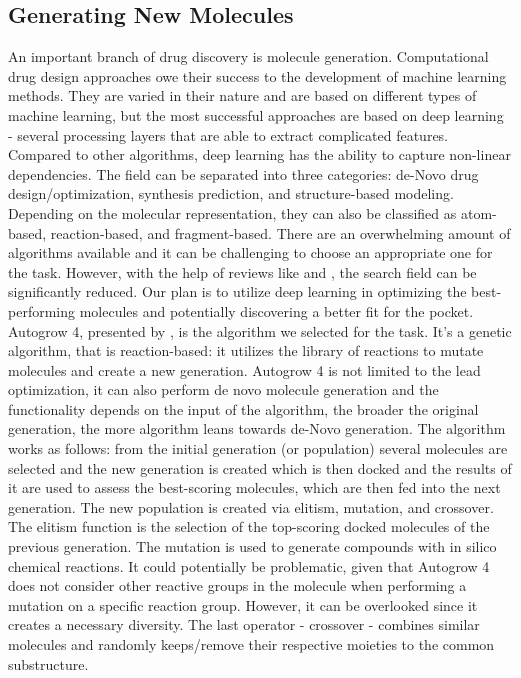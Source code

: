 \documentclass[11pt, letterpaper, titlepage]{article}
\begin{document}
 
\subsection{Generating New Molecules}
An important branch of drug discovery is molecule generation. Computational drug design approaches owe their success to the development of machine learning methods. They are varied in their nature and are based on different types of machine learning, but the most successful approaches are based on deep learning - several processing layers that are able to extract complicated features. Compared to other algorithms, deep learning has the ability to capture non-linear dependencies. The field can be separated into three categories: de-Novo drug design/optimization, synthesis prediction, and structure-based modeling. Depending on the molecular representation, they can also be classified as atom-based, reaction-based, and fragment-based. There are an overwhelming amount of algorithms available and it can be challenging to choose an appropriate one for the task. However, with the help of reviews like \cite{meyers2021novo} and \cite{jimenez2021artificial}, the search field can be significantly reduced.
\newline \newline
Our plan is to utilize deep learning in optimizing the best-performing molecules and potentially discovering a better fit for the pocket. 
\newline \newline
Autogrow 4, presented by \cite{spiegel2020autogrow4}, is the algorithm we selected for the task. It’s a genetic algorithm, that is reaction-based: it utilizes the library of reactions to mutate molecules and create a new generation. 
\newline \newline
Autogrow 4 is not limited to the lead optimization, it can also perform de novo molecule generation and the functionality depends on the input of the algorithm, the broader the original generation, the more algorithm leans towards de-Novo generation.
\newline \newline
The algorithm works as follows: from the initial generation (or population) several molecules are selected and the new generation is created  which is then docked and the results of it are used to assess the best-scoring molecules, which are then fed into the next generation. 
The new population is created via elitism, mutation, and crossover. The elitism function is the selection of the top-scoring docked molecules of the previous generation. The mutation is used to generate compounds with in silico chemical reactions. It could potentially be problematic, given that Autogrow 4 does not consider other reactive groups in the molecule when performing a mutation on a specific reaction group. However, it can be overlooked since it creates a necessary diversity. The last operator - crossover - combines similar molecules and randomly keeps/remove their respective moieties to the common substructure.
\end{document}

